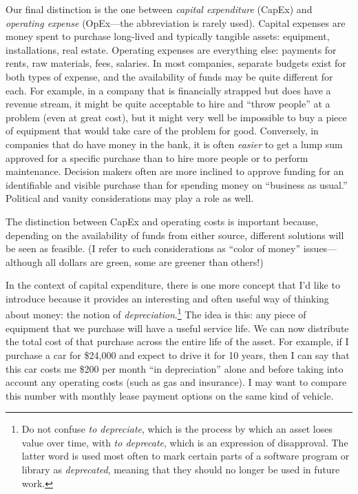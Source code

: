 Our final distinction is the one between \emph{capital expenditure}
(CapEx) and \emph{operating expense} (OpEx---the abbreviation is
rarely used). Capital expenses are money spent to purchase long-lived
and typically tangible assets: equipment, installations, real estate.
Operating expenses are everything else: payments for rents, raw
materials, fees, salaries. In most companies, separate budgets exist
for both types of expense, and the availability of funds may be quite
different for each. For example, in a company that is financially
strapped but does have a revenue stream, it might be quite acceptable
to hire and ``throw people'' at a problem (even at great cost), but it
might very well be impossible to buy a piece of equipment that would
take care of the problem for good. Conversely, in companies that do
have money in the bank, it is often \emph{easier} to get a lump sum
approved for a specific purchase than to hire more people or to
perform maintenance. Decision makers often are more inclined to
approve funding for an identifiable and visible purchase than for
spending money on ``business as usual.'' Political and vanity
considerations may play a role as well.

The distinction between CapEx and operating costs is important
because, depending on the availability of funds from either source,
different solutions will be seen as feasible. (I refer to such
considerations as ``color of money'' issues---although all dollars are
green, some are greener than others!)

In the context of capital expenditure, there is one more concept that
I'd like to introduce because it provides an interesting and often
useful way of thinking about money: the notion of
\emph{depreciation}.\footnote{Do not confuse \emph{to depreciate},
  which is the process by which an asset loses value over time, with
  \emph{to deprecate}, which is an expression of disapproval. The
  latter word is used most often to mark certain parts of a software
  program or library as \emph{deprecated}, meaning that they should no
  longer be used in future work.} The idea is this: any piece of
equipment that we purchase will have a useful service life. We can now
distribute the total cost of that purchase across the entire life of
the asset. For example, if I purchase a car for \$24,000 and expect to
drive it for 10 years, then I can say that this car costs me \$200 per
month ``in depreciation'' alone and before taking into account any
operating costs (such as gas and insurance). I may want to compare
this number with monthly lease payment options on the same kind of
vehicle.

